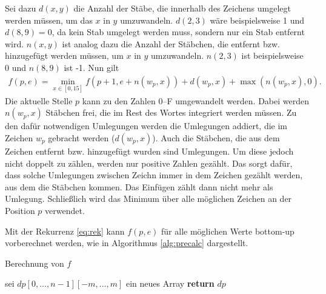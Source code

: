 \documentclass[a4paper,10pt,ngerman]{scrartcl}
\begin{document}
Sei dazu $d(x,y)$ die Anzahl der Stäbe, die innerhalb des Zeichens umgelegt werden müssen, um das $x$ in $y$ umzuwandeln. $d(2, 3)$ wäre beispielsweise 1 und $d(8,9) = 0$, da kein Stab umgelegt werden muss, sondern nur ein Stab entfernt wird.   
$n(x, y)$ ist analog dazu die Anzahl der Stäbchen, die entfernt bzw. hinzugefügt werden müssen, um $x$ in $y$ umzuwandeln.  $n(2, 3)$ ist beispielsweise 0 und $n(8,9)$ ist -1.
Nun gilt
\begin{align}
    f(p, e) = \min_{x\in [0, 15]} f(p + 1, e + n(w_p, x)) + d(w_p, x) + \max(n(w_p, x), 0). \label{eq:rek}
\end{align}
Die aktuelle Stelle $p$ kann zu den Zahlen 0–F umgewandelt werden. Dabei werden $n(w_p, x)$ Stäbchen frei, die im Rest des Wortes integriert werden müssen. Zu den dafür notwendigen Umlegungen werden die Umlegungen addiert, die im Zeichen $w_p$ gebracht werden ($d(w_p, x)$). 
Auch die Stäbchen, die aus dem Zeichen entfernt bzw. hinzugefügt wurden sind Umlegungen. Um diese jedoch nicht doppelt zu zählen, werden nur positive Zahlen gezählt. 
Das sorgt dafür, dass solche Umlegungen zwischen Zeichn immer in dem Zeichen gezählt werden, aus dem die Stäbchen kommen. Das Einfügen zählt dann nicht mehr als Umlegung. 
Schließlich wird das Minimum über alle möglichen Zeichen an der Position $p$ verwendet. 
 
Mit der Rekurrenz \ref{eq:rek} kann $f(p, e)$ für alle möglichen Werte bottom-up vorberechnet werden, wie in Algorithmus \ref{alg:precalc} dargestellt.
\begin{algorithm}
\caption{Berechnung von $f$}
\label{alg:precalc}
\begin{algorithmic}[1]
    \State sei $dp[0, ..., n-1][-m, ..., m]$ ein neues Array
        \EndFor 
    \EndFor
    \State \textbf{return} $dp$
\EndProcedure
\end{algorithmic}
\end{algorithm} 
\end{document}
